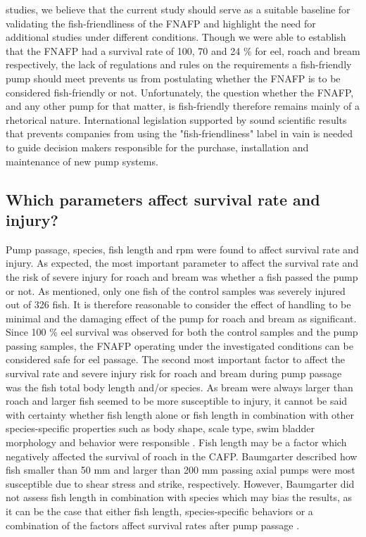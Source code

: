 \documentclass[fleqn,10pt]{wlscirep}
\begin{document}
studies, we believe that the current study should serve as a suitable baseline for validating the fish-friendliness of the FNAFP and highlight the need for additional studies under different conditions. 
Though we were able to establish that the FNAFP had a survival rate of 100, 70 and 24 \% for eel, roach and bream respectively, the lack of regulations and rules on the requirements a fish-friendly pump should meet prevents us from postulating whether the FNAFP is to be considered fish-friendly or not. Unfortunately, the question whether the FNAFP, and any other pump for that matter, is fish-friendly therefore remains mainly of a rhetorical nature. International legislation supported by sound scientific results that prevents companies from using the "fish-friendliness" label in vain is needed to guide decision makers responsible for the purchase, installation and maintenance of new pump systems.

\subsection*{Which parameters affect survival rate and injury?}

Pump passage, species, fish length and rpm were found to affect survival rate and injury. As expected, the most important parameter to affect the survival rate and the risk of severe injury for roach and bream was whether a fish passed the pump or not. As mentioned, only one fish of the control samples was severely injured out of 326 fish. It is therefore reasonable to consider the effect of handling to be minimal and the damaging effect of the pump for roach and bream as significant. Since 100 \% eel survival was observed for both the control samples and the pump passing samples, the FNAFP operating under the investigated conditions can be considered safe for eel passage. The second most important factor to affect the survival rate and severe injury risk for roach and bream during pump passage was the fish total body length and/or species. As bream were always larger than roach and larger fish seemed to be more susceptible to injury, it cannot be said with certainty whether fish length alone or fish length in combination with other species-specific properties such as body shape, scale type, swim bladder morphology and behavior were responsible \cite{Mueller2017EvaluationProtocol,Pauwels2020Multi-speciesBelgium}. Fish length may be a factor which negatively affected the survival of roach in the CAFP. Baumgarter described how fish smaller than 50 mm and larger than 200 mm passing axial pumps were most susceptible due to shear stress and strike, respectively. However, Baumgarter did not assess fish length in combination with species which may bias the results, as it can be the case that either fish length, species-specific behaviors or a combination of the factors affect survival rates after pump passage \cite{Baumgartner2009EffectsFish}.
\end{document}
